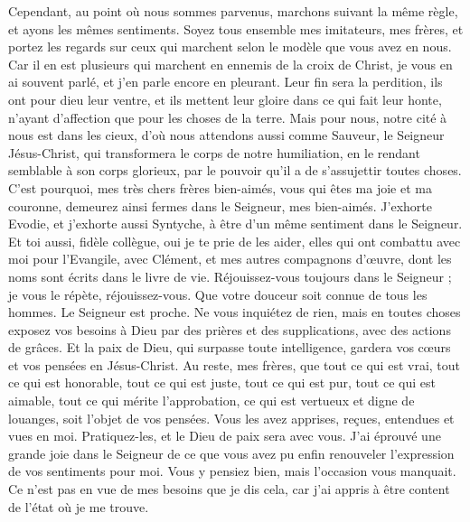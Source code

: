 \begin{multicols}{2}
Cependant, au point où nous sommes parvenus, marchons suivant la même règle, et ayons les mêmes sentiments.
Soyez tous ensemble mes imitateurs, mes frères, et portez les regards sur ceux qui marchent selon le modèle que vous avez en nous.
Car il en est plusieurs qui marchent en ennemis de la croix de Christ, je vous en ai souvent parlé, et j’en parle encore en pleurant.
Leur fin sera la perdition, ils ont pour dieu leur ventre, et ils mettent leur gloire dans ce qui fait leur honte, n'ayant d'affection que pour les choses de la terre.
Mais pour nous, notre cité à nous est dans les cieux, d'où nous attendons aussi comme Sauveur, le Seigneur Jésus-Christ,
qui transformera le corps de notre humiliation, en le rendant semblable à son corps glorieux, par le pouvoir qu’il a de s’assujettir toutes choses.
\VerseOne{}C'est pourquoi, mes très chers frères bien-aimés, vous qui êtes ma joie et ma couronne, demeurez ainsi fermes dans le Seigneur, mes bien-aimés.
J’exhorte Evodie, et j’exhorte aussi Syntyche, à être d’un même sentiment dans le Seigneur.
Et toi aussi, fidèle collègue, oui je te prie de les aider, elles qui ont combattu avec moi pour l'Evangile, avec Clément, et mes autres compagnons d’œuvre, dont les noms sont écrits dans le livre de vie.
Réjouissez-vous toujours dans le Seigneur ; je vous le répète, réjouissez-vous.
Que votre douceur soit connue de tous les hommes. Le Seigneur est proche.
Ne vous inquiétez de rien, mais en toutes choses exposez vos besoins à Dieu par des prières et des supplications, avec des actions de grâces.
Et la paix de Dieu, qui surpasse toute intelligence, gardera vos cœurs et vos pensées en Jésus-Christ.
Au reste, mes frères, que tout ce qui est vrai, tout ce qui est honorable, tout ce qui est juste, tout ce qui est pur, tout ce qui est aimable, tout ce qui mérite l’approbation, ce qui est vertueux et digne de louanges, soit l’objet de vos pensées.
Vous les avez apprises, reçues, entendues et vues en moi. Pratiquez-les, et le Dieu de paix sera avec vous.
J’ai éprouvé une grande joie dans le Seigneur de ce que vous avez pu enfin renouveler l’expression de vos sentiments pour moi. Vous y pensiez bien, mais l’occasion vous manquait.
Ce n’est pas en vue de mes besoins que je dis cela, car j’ai appris à être content de l’état où je me trouve.

\end{multicols}
